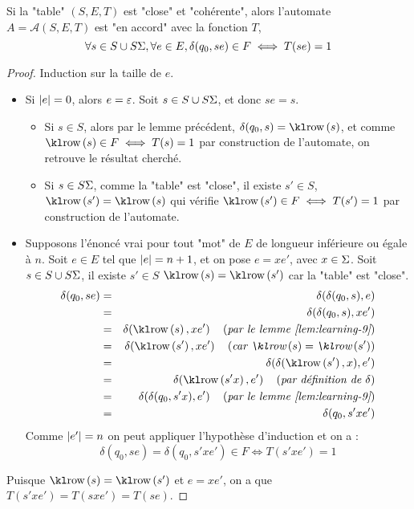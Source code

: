 \begin{lemma}
	Si la "table" $(S,E,T)$ est "close" et "cohérente", alors l'automate $A = \mathcal A (S,E,T)$
	est "en accord" avec la fonction $T$, \ie
	$$\forall s \in S \cup S\Sigma, \forall e \in E, \delta(q_0,se) \in F \iff T(se) =1$$
\end{lemma}

\begin{proof}
	Induction sur la taille de $e$.

	\begin{itemize}
		\item Si $|e| = 0$, alors $e = \varepsilon$.
		      Soit $s \in S \cup S \Sigma$, et donc $se = s$.
		      \begin{itemize}
			      \item Si $s \in S$, alors par le lemme précédent,
			            $\delta(q_0, s) = \row {s}$, et comme $\row {s} \in F \iff T(s) = 1$ par construction de l'automate, on retrouve le résultat cherché.
			      \item Si $s \in S\Sigma$, comme la "table" est "close", il existe $s' \in S$, \tq $\row {s'} = \row s$ qui vérifie
			            $\row {s'} \in F \iff T(s') = 1$ par construction de l'automate.

		      \end{itemize}
		\item Supposons l'énoncé vrai pour tout "mot" de $E$ de longueur inférieure ou égale à $n$. 
		Soit $e \in E$ tel que $|e| = n + 1$,
		      et on pose $e = x e'$, avec $x \in \Sigma$. Soit $s \in S \cup S\Sigma$, il existe
		      $s' \in S$ \tq $\row s = \row {s'}$ car la "table" est "close".
		      \begin{eqnarray*}
			      \delta(q_0, se) &=& \delta(\delta(q_0,s),e) \\
			      &=& \delta(\delta(q_0,s),xe') \\
			      &=& \delta(\row s,xe') \reason{par le lemme \ref{lem:learning-9}} \\
			      &=& \delta(\row {s'},xe') \reason{car $\row s = \row {s'}$} \\
			      &=& \delta(\delta (\row {s'}, x), e') \\
			      &=& \delta(\row {s'x}, e') \reason {par définition de $\delta$}\\
			      &=& \delta(\delta(q_0, s'x), e') \reason{par le lemme \ref{lem:learning-9}} \\
			      &=& \delta(q_0, s'x e')
		      \end{eqnarray*}
		      Comme $|e'| = n$ on peut appliquer l'hypothèse d'induction et on a :
		      $$ \delta(q_0, se) = \delta(q_0, s'x e') \in F \iff T(s'x e') = 1$$

	\end{itemize}
	Puisque $\row s = \row {s'}$  et $e = xe'$, on a que $T(s'xe') = T(sxe') = T(se)$.
\end{proof}

